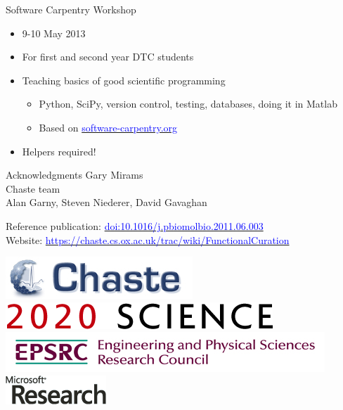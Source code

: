 \documentclass[t,xcolor={usenames,dvipsnames}]{beamer}
\newcommand{\myhref}[2]{\href{#1}{\textcolor{Blue}{#2}}}
\newcommand{\myurl}[1]{\myhref{#1}{#1}}
\newcommand{\doi}[1]{\myhref{http://dx.doi.org/#1}{doi:#1}}
\begin{document}
\begin{frame}{Software Carpentry Workshop}
\begin{itemize}
\item 9-10 May 2013
\item For first and second year DTC students
\item Teaching basics of good scientific programming
  \begin{itemize}
  \item Python, SciPy, version control, testing, databases, doing it in Matlab
  \item Based on \myhref{http://software-carpentry.org/}{software-carpentry.org}
  \end{itemize}
\item Helpers required!
\end{itemize}
\end{frame}


\begin{frame}{Acknowledgments}
Gary Mirams\\
Chaste team\\
Alan Garny, Steven Niederer, David Gavaghan

Reference publication: \doi{10.1016/j.pbiomolbio.2011.06.003}\\
Website: \myurl{https://chaste.cs.ox.ac.uk/trac/wiki/FunctionalCuration}

\begin{center}
\includegraphics[scale=.9]{chaste-266x60}\\ \vspace{.3cm}
\includegraphics[scale=.7]{logo2020science}\\ \vspace{.4cm}
\includegraphics[width=.55\textwidth]{EPSRC1RGBLO} \hspace{.1cm}
\includegraphics[scale=.55]{logo_msr}
\end{center}
\end{frame}
\end{document}
